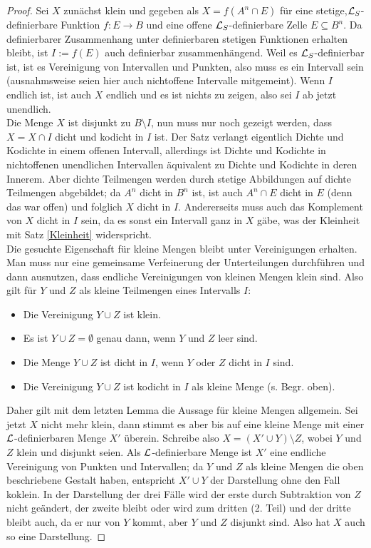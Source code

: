 \begin{proof}
	Sei $X$ zunächst klein und gegeben als $X=f(A^n\cap E)$ für eine stetige,\linebreak $\mathcal{L}_S$-definierbare Funktion $f:E\rightarrow B$ und eine offene $\mathcal{L}_S$-definierbare Zelle $E\subseteq B^n$. Da definierbarer Zusammenhang unter definierbaren stetigen Funktionen erhalten bleibt, ist $I:=f(E)$ auch definierbar zusammenhängend. Weil es $\mathcal{L}_S$-definierbar ist, ist es Vereinigung von Intervallen und Punkten, also muss es ein Intervall sein (ausnahmsweise seien hier auch nichtoffene Intervalle mitgemeint). Wenn $I$ endlich ist, ist auch $X$ endlich und es ist nichts zu zeigen, also sei $I$ ab jetzt unendlich.\\
	Die Menge $X$ ist disjunkt zu $B\setminus I$, nun muss nur noch gezeigt werden, dass $X=X\cap I$ dicht und kodicht in $I$ ist. Der Satz verlangt eigentlich Dichte und Kodichte in einem offenen Intervall, allerdings ist Dichte und Kodichte in nichtoffenen unendlichen Intervallen äquivalent zu Dichte und Kodichte in deren Innerem. Aber dichte Teilmengen werden durch stetige Abbildungen auf dichte Teilmengen abgebildet; da $A^n$ dicht in $B^n$ ist, ist auch $A^n\cap E$ dicht in $E$ (denn das war offen) und folglich $X$ dicht in $I$. Andererseits muss auch das Komplement von $X$ dicht in $I$ sein, da es sonst ein Intervall ganz in $X$ gäbe, was der Kleinheit mit Satz \ref{Kleinheit} widerspricht.\\
	Die gesuchte Eigenschaft für kleine Mengen bleibt unter Vereinigungen erhalten. Man muss nur eine gemeinsame Verfeinerung der Unterteilungen durchführen und dann ausnutzen, dass endliche Vereinigungen von kleinen Mengen klein sind. Also gilt für $Y$ und $Z$ als kleine Teilmengen eines Intervalls $I$:
	\begin{itemize}
		\item Die Vereinigung $Y\cup Z$ ist klein.
		\item Es ist $Y\cup Z=\emptyset$ genau dann, wenn $Y$ und $Z$ leer sind.
		\item Die Menge $Y\cup Z$ ist dicht in $I$, wenn $Y$ oder $Z$ dicht in $I$ sind.
		\item Die Vereinigung $Y\cup Z$ ist kodicht in $I$ als kleine Menge (s. Begr. oben).
	\end{itemize}
    Daher gilt mit dem letzten Lemma die Aussage für kleine Mengen allgemein.\newpage
	Sei jetzt $X$ nicht mehr klein, dann stimmt es aber bis auf eine kleine Menge mit einer $\mathcal{L}$-definierbaren Menge $X'$ überein. Schreibe also $X=(X'\cup Y)\setminus Z$, wobei $Y$ und $Z$ klein und disjunkt seien. Als $\mathcal{L}$-definierbare Menge ist $X'$ eine endliche Vereinigung von Punkten und Intervallen; da $Y$ und $Z$ als kleine Mengen die oben beschriebene Gestalt haben, entspricht $X'\cup Y$ der Darstellung ohne den Fall koklein. In der Darstellung der drei Fälle wird der erste durch Subtraktion von $Z$ nicht geändert, der zweite bleibt oder wird zum dritten (2. Teil) und der dritte bleibt auch, da er nur von $Y$ kommt, aber $Y$ und $Z$ disjunkt sind. Also hat $X$ auch so eine Darstellung.
\end{proof}

